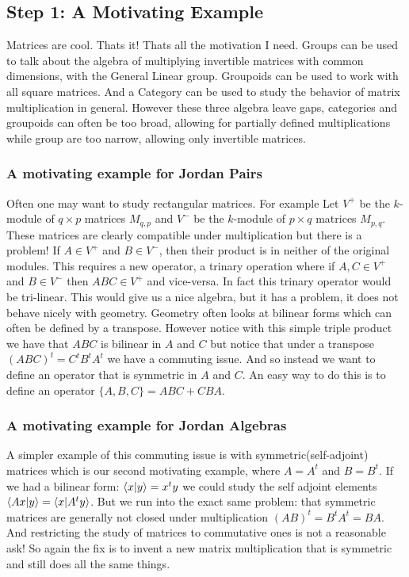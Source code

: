 \subsection{Step 1: A Motivating Example}
Matrices are cool. Thats it! Thats all the motivation I need.
Groups can be used to talk about the algebra of multiplying 
invertible matrices with common dimensions, with the General Linear group.
Groupoids can be used to work with all square matrices. And a Category can be 
used to study the behavior of matrix multiplication in general. However these 
three algebra leave gaps, categories and groupoids can often be too broad, allowing
for partially defined multiplications while group are too narrow, allowing only 
invertible matrices.

\subsubsection*{A motivating example for Jordan Pairs}
Often one may want to study rectangular matrices. For example Let $V^+$ be the 
$k$-module of $q\times p$ matrices $M_{q,p}$ and $V^-$ be the 
$k$-module of $p\times q$ matrices $M_{p,q}$. These matrices are clearly compatible under 
multiplication but there is a problem! If $A\in V^+$ and $B\in V^-$, then their product is in neither
of the original modules. This requires a new operator, a trinary operation where if $A,C\in V^+$ and $B\in V^-$
then $ABC\in V^+$ and vice-versa. In fact this trinary operator would be tri-linear.
This would give us a nice algebra, but it has a problem, it does not behave nicely with geometry.
Geometry often looks at bilinear forms which can often be defined by a transpose. 
However notice with this simple triple product we have that $ABC$ is bilinear in $A$ and $C$ but notice that 
under a transpose $(ABC)^t=C^tB^tA^t$ we have a commuting issue. And so instead we want to define an operator
that is symmetric in $A$ and $C$. An easy way to do this is to define an operator $\{A,B,C\}=ABC+CBA$.

\subsubsection*{A motivating example for Jordan Algebras}
\label{sec:symmats}
A simpler example of this commuting issue is with symmetric(self-adjoint) matrices which is our second motivating example, where $A=A^t$ and $B=B^t$. 
If we had a bilinear form: $\left\langle x|y \right\rangle=x^ty$ we could study the self adjoint elements $\left\langle Ax|y \right\rangle=\left\langle x|A^ty \right\rangle$. 
But we run into the exact same problem: that symmetric matrices are generally not closed under multiplication
$(AB)^t=B^tA^t=BA$. And restricting the study of matrices to commutative ones is not a reasonable ask! 
So again the fix is to invent a new matrix multiplication that is symmetric and still does all the same things.

